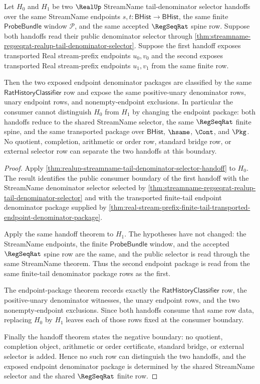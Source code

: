 \begin{theorem}
\label{thm:realup-streamname-tail-selector-transport-determinacy}
Let $H_0$ and $H_1$ be two $\RealUp$ StreamName tail-denominator selector
handoffs over the same StreamName endpoints $s,t:\mathsf{BHist}\to
\mathsf{BHist}$, the same finite $\mathsf{ProbeBundle}$ window $\mathcal P$,
and the same accepted $\RegSeqRat$ spine row. Suppose both handoffs read their
public denominator selector through
\autoref{thm:streamname-regseqrat-realup-tail-denominator-selector}. Suppose
the first handoff exposes transported Real stream-prefix endpoints $u_0,v_0$
and the second exposes transported Real stream-prefix endpoints $u_1,v_1$ from
the same finite row.

Then the two exposed endpoint denominator packages are classified by the same
$\mathsf{RatHistoryClassifier}$ row and expose the same positive-unary
denominator rows, unary endpoint rows, and nonempty-endpoint exclusions. In
particular the consumer cannot distinguish $H_0$ from $H_1$ by changing the
endpoint package: both handoffs reduce to the shared StreamName selector, the
same $\RegSeqRat$ finite spine, and the same transported package over
$\mathsf{BHist}$, $\hsame$, $\Cont$, and $\Pkg$. No quotient, completion,
arithmetic or order row, standard bridge row, or external selector row can
separate the two handoffs at this boundary.
\end{theorem}
\begin{proof}
Apply
\autoref{thm:realup-streamname-tail-denominator-selector-handoff} to $H_0$.
The result identifies the public consumer boundary of the first handoff with
the StreamName denominator selector selected by
\autoref{thm:streamname-regseqrat-realup-tail-denominator-selector} and with
the transported finite-tail endpoint denominator package supplied by
\autoref{thm:real-stream-prefix-finite-tail-transported-endpoint-denominator-package}.

Apply the same handoff theorem to $H_1$. The hypotheses have not changed: the
StreamName endpoints, the finite $\mathsf{ProbeBundle}$ window, and the
accepted $\RegSeqRat$ spine row are the same, and the public selector is read
through the same StreamName theorem. Thus the second endpoint package is read
from the same finite-tail denominator package rows as the first.

The endpoint-package theorem records exactly the
$\mathsf{RatHistoryClassifier}$ row, the positive-unary denominator witnesses,
the unary endpoint rows, and the two nonempty-endpoint exclusions. Since both
handoffs consume that same row data, replacing $H_0$ by $H_1$ leaves each of
those rows fixed at the consumer boundary.

Finally the handoff theorem states the negative boundary: no quotient,
completion object, arithmetic or order certificate, standard bridge, or
external selector is added. Hence no such row can distinguish the two handoffs,
and the exposed endpoint denominator package is determined by the shared
StreamName selector and the shared $\RegSeqRat$ finite row.
\end{proof}
